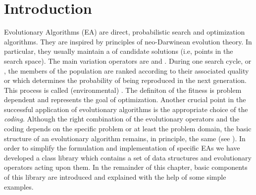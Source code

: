 %
%
\section{Introduction}

Evolutionary Algorithms (EA) are
direct, probabilistic search and optimization algorithms.  They are
inspired by principles of neo-Darwinean evolution theory.  In
particular, they usually maintain a \emph{} of
candidate solutions (i.e, points in the search space).  The main
variation operators are \emph{} and
\emph{}.  During one search cycle, or
\emph{}, the members of the population are ranked
according to their associated quality or \emph{}
which determines the probability of being reproduced in the next
generation. This process is called (environmental)
\emph{}. The definiton of the fitness is problem
dependent and represents the goal of optimization.  Another crucial
point in the successful application of evolutionary algorithms is the
appropriate choice of the \emph{coding}.  Although the right
combination of the evolutionary operators and the coding depends on
the specific problem or at least the problem domain, the basic
structure of an evolutionary algorithm remains, in principle, the same
(see ).  In order to simplify the
formulation and implementation of specific EAs we have developed a
class library which contains a set of data structures and evolutionary
operators acting upon them.  In the remainder of this chapter, basic
components of this library are introduced and explained with the help
of some simple examples.

